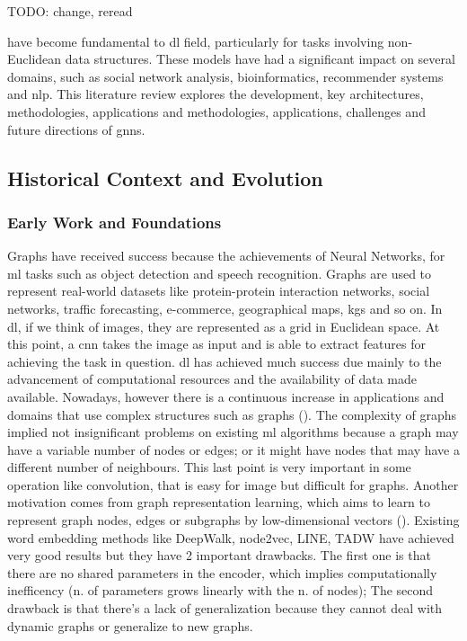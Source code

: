 TODO: change, reread

 have become fundamental to \acrlong{dl} field, particularly for tasks involving non-Euclidean data structures. These models have had a significant impact on several domains, such as social network analysis, bioinformatics, recommender systems and \gls{nlp}. This literature review explores the development, key architectures, methodologies, applications and
methodologies, applications, challenges and future directions of \glspl{gnn}.

\subsection*{Historical Context and Evolution}

\subsubsection*{Early Work and Foundations}

Graphs have received success because the achievements of Neural Networks, for \gls{ml} tasks such as object detection and speech recognition. Graphs are used to represent real-world datasets like protein-protein interaction networks, social networks, traffic forecasting, e-commerce, geographical maps, \glspl{kg} and so on. In \acrlong{dl}, if we think of images, they are represented as a grid in Euclidean space. At this point, a \gls{cnn} takes the image as input and is able to extract features for achieving the task in question.
\gls{dl} has achieved much success due mainly to the advancement of computational resources and the availability of data made available. 
Nowadays, however there is a continuous increase in applications and domains that use complex structures such as graphs (\cite{Wu2021}).
The complexity of graphs implied not insignificant problems on existing \gls{ml} algorithms because a graph may have a variable number of nodes or edges; or it might have nodes that may have a different number of neighbours.
This last point is very important in some operation like convolution, that is easy for image but difficult for graphs.
Another motivation comes from graph representation learning, which aims to learn to represent graph nodes, edges or subgraphs by low-dimensional vectors (\cite{Zhou2020}).
Existing word embedding methods like DeepWalk, node2vec, LINE, TADW have achieved very good results but they have 2 important drawbacks. The first one is that there are no shared parameters in the encoder, which implies computationally inefficency (n. of parameters grows linearly with the n. of nodes);
The second drawback is that there's a lack of generalization because they cannot deal with dynamic graphs or generalize to new graphs.

